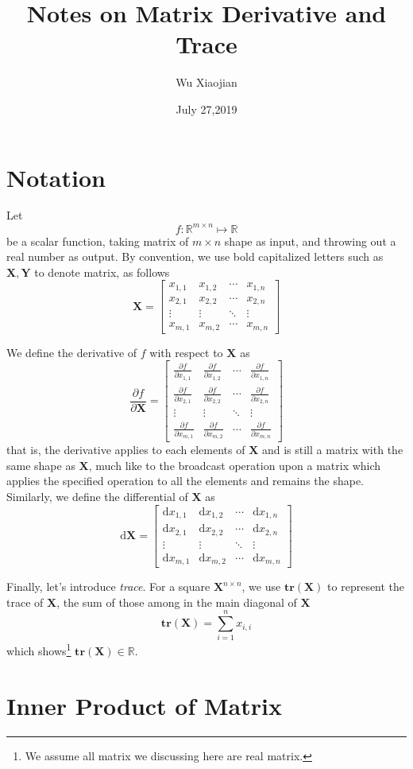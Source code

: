 \documentclass{article}
\author{Wu Xiaojian}
\title{Notes on Matrix Derivative and Trace}
\date{July 27,2019}
\newcommand{\Matrix}[3]{
    \begin{bmatrix}
        #1_{1,1}&#1_{1,2}&\cdots&#1_{1,#3}\\
        #1_{2,1}&#1_{2,2}&\cdots&#1_{2,#3}\\
        \vdots&\vdots&\ddots&\vdots\\
        #1_{#2,1}&#1_{#2,2}&\cdots&#1_{#2,#3}
    \end{bmatrix}
}
\newcommand{\MatrixDerivativeCompleteForm}[4]{
    \begin{bmatrix}
        \frac{\partial#1}{\partial#2_{1,1}}&\frac{\partial#1}{\partial#2_{1,2}}&\cdots&\frac{\partial#1}{\partial#2_{1,#4}}\\
        \frac{\partial#1}{\partial#2_{2,1}}&\frac{\partial#1}{\partial#2_{2,2}}&\cdots&\frac{\partial#1}{\partial#2_{2,#4}}\\
        \vdots&\vdots&\ddots&\vdots\\
        \frac{\partial#1}{\partial#2_{#3,1}}&\frac{\partial#1}{\partial#2_{#3,2}}&\cdots&\frac{\partial#1}{\partial#2_{#3,#4}}
    \end{bmatrix}
}
\newcommand{\MatrixDerivative}[2]{
    \ensuremath{\frac{\partial#1}{\partial#2}}
}
\newcommand{\Trace}{\ensuremath{\mathbf{tr}}}
\newcommand{\Differential}{\ensuremath{\mathrm{d}}}
\newcommand{\MatrixSymbol}[1]{\ensuremath{{\boldsymbol{#1}}}}
\newcommand{\MatrixX}{\MatrixSymbol{X}}
\theoremstyle{nonumberplain}
\begin{document}
\maketitle

\section{Notation}

Let 
\begin{equation}
    f:\mathbb{R}^{m\times n}\mapsto \mathbb{R}
\end{equation} be a scalar function, taking matrix of $m\times n$ shape as input, and throwing out a real number as output. 
By convention, we use bold capitalized letters such as $\MatrixSymbol{X},\MatrixSymbol{Y}$ to denote matrix, as follows
\begin{equation*}
    \MatrixSymbol{X}=\Matrix{x}{m}{n}
\end{equation*}

We define the derivative of $f$ with respect to $\MatrixX$ as 
\begin{equation}
    \MatrixDerivative{f}{\MatrixX}=\MatrixDerivativeCompleteForm{f}{x}{m}{n}
\end{equation}
that is, the derivative applies to each elements of $\MatrixX$ and is still a matrix with the same shape as $\MatrixX$, much like to the broadcast operation upon a matrix which applies the specified operation to all the elements and remains the shape. Similarly, we define the differential of $\MatrixX$ as
\begin{equation}
    \Differential\MatrixX=\Matrix{\Differential x}{m}{n}
\end{equation}

Finally, let's introduce \textit{trace}. For a square $\MatrixX^{n\times n}$, we use $\Trace(\MatrixX)$ to represent the trace of $\MatrixX$, the sum of those among in the main diagonal of $\MatrixX$
\begin{equation}
    \Trace(\MatrixX)=\sum_{i=1}^{n}x_{i,i}
\end{equation}
which shows\footnote{We assume all matrix we discussing here are real matrix.} $\Trace(\MatrixX)\in\mathbb{R}$. 

\section{Inner Product of Matrix}
\end{document}
